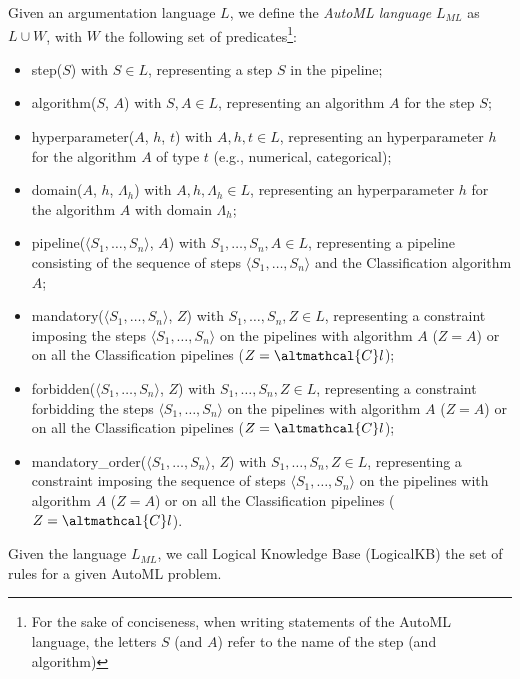 \begin{definition}
Given an argumentation language $L$, we define the \emph{AutoML language} $L_{ML}$ as $L \cup W$, with $W$ the following set of predicates\footnote{For the sake of conciseness, when writing statements of the AutoML language, the letters $S$ (and $A$) refer to the name of the step (and algorithm)}:
\begin{itemize}
    \item step($S$) with $S \in L$, representing a step $S$ in the pipeline;
    \item algorithm($S$, $A$) with $S, A \in L$, representing an algorithm $A$ for the step $S$;
    \item hyperparameter($A$, $h$, $t$) with $A, h, t \in L$, representing an hyperparameter $h$ for the algorithm $A$ of type $t$ (e.g., numerical, categorical);
    \item domain($A$, $h$, $\Lambda_h$) with $A, h, \Lambda_h \in L$, representing an hyperparameter $h$ for the algorithm $A$ with domain $\Lambda_h$;
    \item pipeline($\langle S_1, \ldots, S_n \rangle$, $A$) with $S_1, \ldots, S_n, A \in L$, representing a pipeline consisting of the sequence of steps $\langle S_1, \ldots, S_n \rangle$ and the Classification algorithm $A$;
    \item mandatory($\langle S_1, \ldots, S_n \rangle$, $Z$) with $S_1, \ldots, S_n, Z \in L$, representing a constraint imposing the steps $\langle S_1, \ldots, S_n \rangle$ on the pipelines with algorithm $A$ ($Z = A$) or on all the Classification pipelines ($Z = \altmathcal{C}l$);
    \item forbidden($\langle S_1, \ldots, S_n \rangle$, $Z$) with $S_1, \ldots, S_n, Z \in L$, representing a constraint forbidding the steps $\langle S_1, \ldots, S_n \rangle$ on the pipelines with algorithm $A$ ($Z = A$) or on all the Classification pipelines ($Z = \altmathcal{C}l$);
    \item mandatory\_order($\langle S_1, \ldots, S_n \rangle$, $Z$) with $S_1, \ldots, S_n, Z \in L$, representing a constraint imposing the sequence of steps $\langle S_1, \ldots, S_n \rangle$ on the pipelines with algorithm $A$ ($Z = A$) or on all the Classification pipelines ($Z = \altmathcal{C}l$).
\end{itemize}
\end{definition}

\begin{definition}
Given the language $L_{ML}$, we call Logical Knowledge Base (LogicalKB) the set of rules for a given AutoML problem.
\end{definition}


